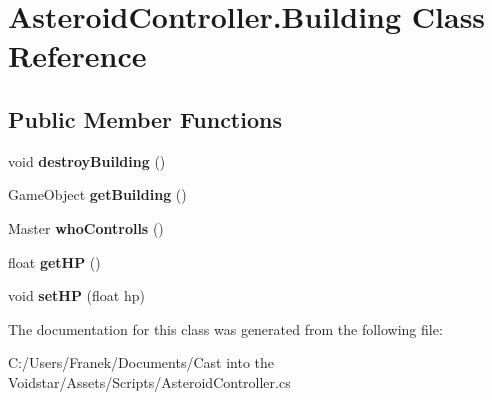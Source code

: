 \hypertarget{class_asteroid_controller_1_1_building}{}\section{Asteroid\+Controller.\+Building Class Reference}
\label{class_asteroid_controller_1_1_building}
\subsection*{Public Member Functions}
\begin{DoxyCompactItemize}
\item 
\hypertarget{class_asteroid_controller_1_1_building_aa459e03784cd13bb7721a45a410f6676}{}void {\bfseries destroy\+Building} ()\label{class_asteroid_controller_1_1_building_aa459e03784cd13bb7721a45a410f6676}

\item 
\hypertarget{class_asteroid_controller_1_1_building_a924015ad91f9057bc12339a629e7f478}{}Game\+Object {\bfseries get\+Building} ()\label{class_asteroid_controller_1_1_building_a924015ad91f9057bc12339a629e7f478}

\item 
\hypertarget{class_asteroid_controller_1_1_building_ad9f7cc6118bc26552a28bed625a0b4e4}{}Master {\bfseries who\+Controlls} ()\label{class_asteroid_controller_1_1_building_ad9f7cc6118bc26552a28bed625a0b4e4}

\item 
\hypertarget{class_asteroid_controller_1_1_building_a08c8ffcba512689bda4c6ac59f2e8a18}{}float {\bfseries get\+H\+P} ()\label{class_asteroid_controller_1_1_building_a08c8ffcba512689bda4c6ac59f2e8a18}

\item 
\hypertarget{class_asteroid_controller_1_1_building_a1f2fb2f9ea4c54952bb4af3fc62d288f}{}void {\bfseries set\+H\+P} (float hp)\label{class_asteroid_controller_1_1_building_a1f2fb2f9ea4c54952bb4af3fc62d288f}

\end{DoxyCompactItemize}


The documentation for this class was generated from the following file\+:\begin{DoxyCompactItemize}
\item 
C\+:/\+Users/\+Franek/\+Documents/\+Cast into the Voidstar/\+Assets/\+Scripts/Asteroid\+Controller.\+cs\end{DoxyCompactItemize}
